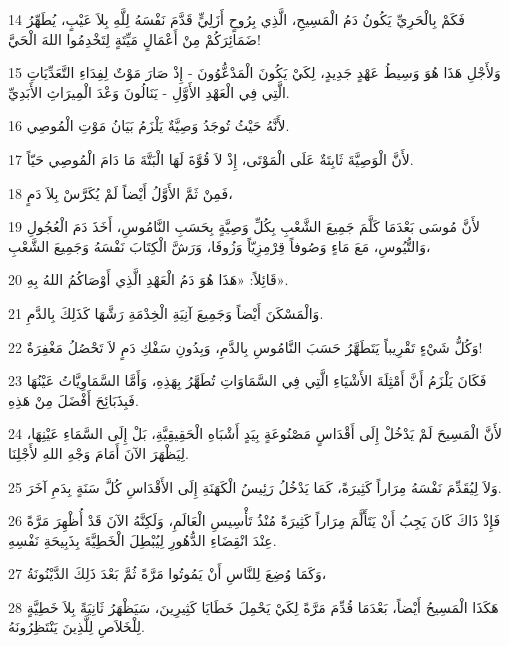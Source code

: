 \par 14 فَكَمْ بِالْحَرِيِّ يَكُونُ دَمُ الْمَسِيحِ، الَّذِي بِرُوحٍ أَزَلِيٍّ قَدَّمَ نَفْسَهُ لِلَّهِ بِلاَ عَيْبٍ، يُطَهِّرُ ضَمَائِرَكُمْ مِنْ أَعْمَالٍ مَيِّتَةٍ لِتَخْدِمُوا اللهَ الْحَيَّ!
\par 15 وَلأَجْلِ هَذَا هُوَ وَسِيطُ عَهْدٍ جَدِيدٍ، لِكَيْ يَكُونَ الْمَدْعُّوُونَ - إِذْ صَارَ مَوْتٌ لِفِدَاءِ التَّعَدِّيَاتِ الَّتِي فِي الْعَهْدِ الأَوَّلِ - يَنَالُونَ وَعْدَ الْمِيرَاثِ الأَبَدِيِّ.
\par 16 لأَنَّهُ حَيْثُ تُوجَدُ وَصِيَّةٌ يَلْزَمُ بَيَانُ مَوْتِ الْمُوصِي.
\par 17 لأَنَّ الْوَصِيَّةَ ثَابِتَةٌ عَلَى الْمَوْتَى، إِذْ لاَ قُوَّةَ لَهَا الْبَتَّةَ مَا دَامَ الْمُوصِي حَيّاً.
\par 18 فَمِنْ ثَمَّ الأَوَّلُ أَيْضاً لَمْ يُكَرَّسْ بِلاَ دَمٍ،
\par 19 لأَنَّ مُوسَى بَعْدَمَا كَلَّمَ جَمِيعَ الشَّعْبِ بِكُلِّ وَصِيَّةٍ بِحَسَبِ النَّامُوسِ، أَخَذَ دَمَ الْعُجُولِ وَالتُّيُوسِ، مَعَ مَاءٍ وَصُوفاً قِرْمِزِيّاً وَزُوفَا، وَرَشَّ الْكِتَابَ نَفْسَهُ وَجَمِيعَ الشَّعْبِ،
\par 20 قَائِلاً: «هَذَا هُوَ دَمُ الْعَهْدِ الَّذِي أَوْصَاكُمُ اللهُ بِهِ».
\par 21 وَالْمَسْكَنَ أَيْضاً وَجَمِيعَ آنِيَةِ الْخِدْمَةِ رَشَّهَا كَذَلِكَ بِالدَّمِ.
\par 22 وَكُلُّ شَيْءٍ تَقْرِيباً يَتَطَهَّرُ حَسَبَ النَّامُوسِ بِالدَّمِ، وَبِدُونِ سَفْكِ دَمٍ لاَ تَحْصُلُ مَغْفِرَةٌ!
\par 23 فَكَانَ يَلْزَمُ أَنَّ أَمْثِلَةَ الأَشْيَاءِ الَّتِي فِي السَّمَاوَاتِ تُطَهَّرُ بِهَذِهِ، وَأَمَّا السَّمَاوِيَّاتُ عَيْنُهَا فَبِذَبَائِحَ أَفْضَلَ مِنْ هَذِهِ.
\par 24 لأَنَّ الْمَسِيحَ لَمْ يَدْخُلْ إِلَى أَقْدَاسٍ مَصْنُوعَةٍ بِيَدٍ أَشْبَاهِ الْحَقِيقِيَّةِ، بَلْ إِلَى السَّمَاءِ عَيْنِهَا، لِيَظْهَرَ الآنَ أَمَامَ وَجْهِ اللهِ لأَجْلِنَا.
\par 25 وَلاَ لِيُقَدِّمَ نَفْسَهُ مِرَاراً كَثِيرَةً، كَمَا يَدْخُلُ رَئِيسُ الْكَهَنَةِ إِلَى الأَقْدَاسِ كُلَّ سَنَةٍ بِدَمِ آخَرَ.
\par 26 فَإِذْ ذَاكَ كَانَ يَجِبُ أَنْ يَتَأَلَّمَ مِرَاراً كَثِيرَةً مُنْذُ تَأْسِيسِ الْعَالَمِ، وَلَكِنَّهُ الآنَ قَدْ أُظْهِرَ مَرَّةً عِنْدَ انْقِضَاءِ الدُّهُورِ لِيُبْطِلَ الْخَطِيَّةَ بِذَبِيحَةِ نَفْسِهِ.
\par 27 وَكَمَا وُضِعَ لِلنَّاسِ أَنْ يَمُوتُوا مَرَّةً ثُمَّ بَعْدَ ذَلِكَ الدَّيْنُونَةُ،
\par 28 هَكَذَا الْمَسِيحُ أَيْضاً، بَعْدَمَا قُدِّمَ مَرَّةً لِكَيْ يَحْمِلَ خَطَايَا كَثِيرِينَ، سَيَظْهَرُ ثَانِيَةً بِلاَ خَطِيَّةٍ لِلْخَلاَصِ لِلَّذِينَ يَنْتَظِرُونَهُ.

